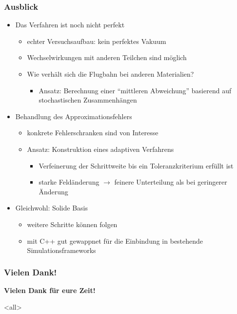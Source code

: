 \mode*

\begin{frame}
  \frametitle{Ausblick}
  \onslide<+->
  \begin{itemize}
    \item<+-> Das Verfahren ist noch nicht perfekt
      \begin{itemize}
        \item<+-> echter Versuchsaufbau: kein perfektes Vakuum
        \item<+-> Wechselwirkungen mit anderen Teilchen sind m\"oglich
        \item<+-> Wie verh\"alt sich die Flugbahn bei anderen Materialien?
          \begin{itemize}
            \item<+-> Ansatz: Berechnung einer "`mittleren Abweichung"' basierend auf stochastischen Zusammenh\"angen
          \end{itemize}
      \end{itemize}
    \item<+-> Behandlung des Approximationsfehlers
      \begin{itemize}
        \item<+-> konkrete Fehlerschranken sind von Interesse
        \item<+-> Ansatz: Konstruktion eines adaptiven Verfahrens
          \begin{itemize}
            \item<+-> Verfeinerung der Schrittweite bis ein Toleranzkriterium erf\"ullt ist
            \item<+-> starke Feld\"anderung \(\rightarrow\) feinere Unterteilung als bei geringerer \"Anderung
          \end{itemize}
      \end{itemize}
    \item<+-> Gleichwohl: Solide Basis
      \begin{itemize}
        \item<+-> weitere Schritte k\"onnen folgen
        \item<+-> mit C++ gut gewappnet f\"ur die Einbindung in bestehende Simulationsframeworks
      \end{itemize}
  \end{itemize}
\end{frame}

\begin{frame}
  \frametitle{Vielen Dank!}
  \centering
  \textbf{Vielen Dank f\"ur eure Zeit!}
\end{frame}

\mode<all>

